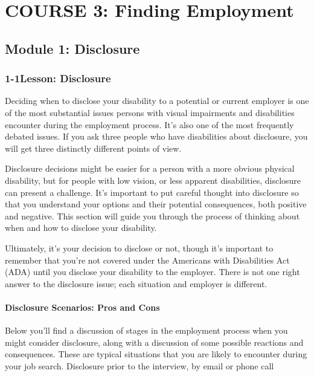 \hypertarget{course3}{}\chapter*{COURSE 3: Finding Employment}\label{course3}
\noindent\makebox[\linewidth]{\rule{\linewidth}{0.4pt}}
\localtableofcontents 
\noindent\makebox[\textwidth]{\rule{\linewidth}{0.4pt}} 
\newpage

\pagebreak \section*{Module 1: Disclosure}
\noindent\makebox[\textwidth]{\rule{\linewidth}{0.4pt}} 
\localtableofcontents 
\noindent\makebox[\textwidth]{\rule{\linewidth}{0.4pt}} 


\pagebreak \subsection*{1-1\quad Lesson: Disclosure}
Deciding when to disclose your disability to a potential or current employer is one of the most substantial issues persons with visual impairments and disabilities encounter during the employment process. It's also one of the most frequently debated issues. If you ask three people who have disabilities about disclosure, you will get three distinctly different points of view.

Disclosure decisions might be easier for a person with a more obvious physical disability, but for people with low vision, or less apparent disabilities, disclosure can present a challenge. It's important to put careful thought into disclosure so that you understand your options and their potential consequences, both positive and negative. This section will guide you through the process of thinking about when and how to disclose your disability.

Ultimately, it's your decision to disclose or not, though it's important to remember that you're not covered under the Americans with Disabilities Act (ADA) until you disclose your disability to the employer. There is not one right answer to the disclosure issue; each situation and employer is different.

\subsubsection*{Disclosure Scenarios: Pros and Cons}
Below you'll find a discussion of stages in the employment process when you might consider disclosure, along with a discussion of some possible reactions and consequences. These are typical situations that you are likely to encounter during your job search.
Disclosure prior to the interview, by email or phone call 

